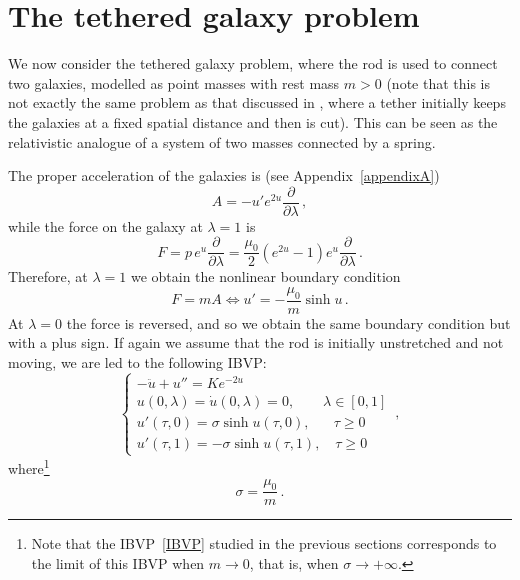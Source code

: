 \documentclass[10pt]{amsart}
\begin{document}
\section{The tethered galaxy problem}\label{section5}
%
We now consider the tethered galaxy problem, where the rod is used to connect two galaxies, modelled as point masses with rest mass $m>0$ (note that this is not exactly the same problem as that discussed in \cite{DLW03}, where a tether initially keeps the galaxies at a fixed spatial distance and then is cut). This can be seen as the relativistic analogue of a system of two masses connected by a spring.

The proper acceleration of the galaxies is (see Appendix~\ref{appendixA})
\begin{equation}
A = - u' e^{2u} \frac{\partial}{\partial \lambda} \, ,
\end{equation}
while the force on the galaxy at $\lambda=1$ is
\begin{equation}
F = p \, e^u \frac{\partial}{\partial \lambda} = \frac{\mu_0}2 \left( e^{2u} - 1 \right) e^u \frac{\partial}{\partial \lambda} \, .
\end{equation}
Therefore, at $\lambda=1$ we obtain the nonlinear boundary condition
\begin{equation}
F = m A \Leftrightarrow u' = - \frac{\mu_0}{m} \sinh u \, .
\end{equation}
At $\lambda=0$ the force is reversed, and so we obtain the same boundary condition but with a plus sign. If again we assume that the rod is initially unstretched and not moving, we are led to the following IBVP:
\begin{equation} \label{IBVP2}
\begin{cases}
- \ddot{u} + u'' = K e^{- 2u} \\
u(0,\lambda)=\dot{u}(0,\lambda)=0, \quad \quad \lambda \in [0,1] \\
u'(\tau,0) = \sigma \sinh u(\tau,0), \quad \,\,\,\, \tau\geq 0 \\
u'(\tau,1) = - \sigma \sinh u(\tau,1), \quad \tau\geq 0
\end{cases} \, ,
\end{equation}
where\footnote{Note that the IBVP~\eqref{IBVP} studied in the previous sections corresponds to the limit of this IBVP when $m \to 0$, that is, when $\sigma \to + \infty$.}
\begin{equation}
\sigma = \frac{\mu_0}{m} \, .
\end{equation}
\end{document}
